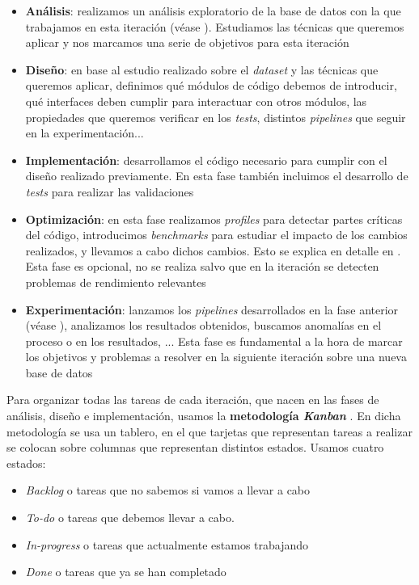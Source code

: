 \begin{itemize}
	\item \textbf{Análisis}: realizamos un análisis exploratorio de la base de datos con la que trabajamos en esta iteración (véase ). Estudiamos las técnicas que queremos aplicar y nos marcamos una serie de objetivos para esta iteración
	\item \textbf{Diseño}: en base al estudio realizado sobre el \textit{dataset} y las técnicas que queremos aplicar, definimos qué módulos de código debemos de introducir, qué interfaces deben cumplir para interactuar con otros módulos, las propiedades que queremos verificar en los \textit{tests}, distintos \textit{pipelines} que seguir en la experimentación...
	\item \textbf{Implementación}: desarrollamos el código necesario para cumplir con el diseño realizado previamente. En esta fase también incluimos el desarrollo de \textit{tests} para realizar las validaciones
	\item \textbf{Optimización}: en esta fase realizamos \textit{profiles} para detectar partes críticas del código, introducimos \textit{benchmarks} para estudiar el impacto de los cambios realizados, y llevamos a cabo dichos cambios. Esto se explica en detalle en . Esta fase es opcional, no se realiza salvo que en la iteración se detecten problemas de rendimiento relevantes
	\item \textbf{Experimentación}: lanzamos los \textit{pipelines} desarrollados en la fase anterior (véase ), analizamos los resultados obtenidos, buscamos anomalías en el proceso o en los resultados, ... Esta fase es fundamental a la hora de marcar los objetivos y problemas a resolver en la siguiente iteración sobre una nueva base de datos
\end{itemize}

Para organizar todas las tareas de cada iteración, que nacen en las fases de análisis, diseño e implementación, usamos la \textbf{metodología \textit{Kanban}} \cite{informatica:kanban_paper}. En dicha metodología se usa un tablero, en el que tarjetas que representan tareas a realizar se colocan sobre columnas que representan distintos estados. Usamos cuatro estados:

\begin{itemize}
	\item \textit{Backlog} o tareas que no sabemos si vamos a llevar a cabo
	\item \textit{To-do} o tareas que debemos llevar a cabo.
	\item \textit{In-progress} o tareas que actualmente estamos trabajando
	\item \textit{Done} o tareas que ya se han completado
\end{itemize}

